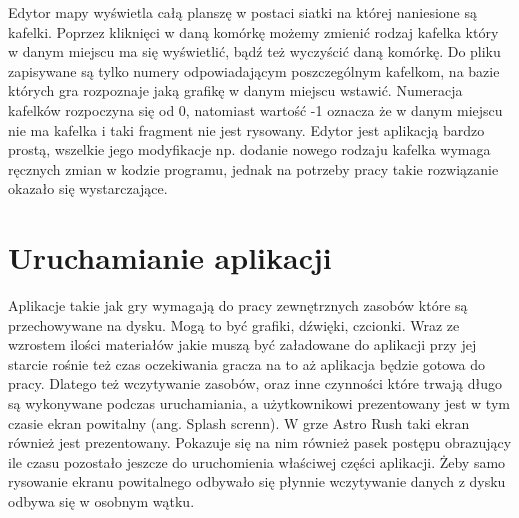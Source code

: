 Edytor mapy wyświetla całą planszę w postaci siatki na której naniesione są kafelki. Poprzez kliknięci w daną komórkę możemy zmienić rodzaj kafelka który w danym miejscu ma się wyświetlić, bądź też wyczyścić daną komórkę. Do pliku zapisywane są tylko numery odpowiadającym poszczególnym kafelkom, na bazie których gra rozpoznaje jaką grafikę w danym miejscu wstawić. Numeracja kafelków rozpoczyna się od 0, natomiast wartość -1 oznacza że w danym miejscu nie ma kafelka i taki fragment nie jest rysowany. Edytor jest aplikacją bardzo prostą, wszelkie jego modyfikacje np. dodanie nowego rodzaju kafelka wymaga ręcznych zmian w kodzie programu, jednak na potrzeby pracy takie rozwiązanie okazało się wystarczające.

\section{Uruchamianie aplikacji}
Aplikacje takie jak gry wymagają do pracy zewnętrznych zasobów które są przechowywane na dysku. Mogą to być grafiki, dźwięki, czcionki. Wraz ze wzrostem ilości materiałów jakie muszą być załadowane do aplikacji przy jej starcie rośnie też czas oczekiwania gracza na to aż aplikacja będzie gotowa do pracy. Dlatego też wczytywanie zasobów, oraz inne czynności które trwają długo są wykonywane podczas uruchamiania, a użytkownikowi prezentowany jest w tym czasie ekran powitalny (ang. Splash screnn). W grze Astro Rush taki ekran również jest prezentowany. Pokazuje się na nim również pasek postępu obrazujący ile czasu pozostało jeszcze do uruchomienia właściwej części aplikacji. Żeby samo rysowanie ekranu powitalnego odbywało się płynnie wczytywanie danych z dysku odbywa się w osobnym wątku.

